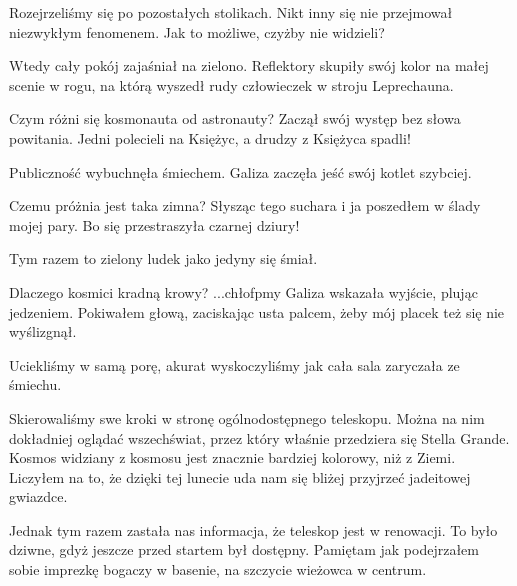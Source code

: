Rozejrzeliśmy się po pozostałych stolikach. Nikt inny się nie przejmował niezwykłym fenomenem.
Jak to możliwe, czyżby nie widzieli?

Wtedy cały pokój zajaśniał na zielono.
Reflektory skupiły swój kolor na małej scenie w rogu, na którą wyszedł rudy człowieczek w stroju Leprechauna.

\begin{dialogue}
	\ds{} Czym różni się kosmonauta od astronauty? \dm{} Zaczął swój występ bez słowa powitania. \dm{} Jedni polecieli na Księżyc, a drudzy z Księżyca spadli!
\end{dialogue}

Publiczność wybuchnęła śmiechem. Galiza zaczęła jeść swój kotlet szybciej.

\begin{dialogue}
	\ds{} Czemu próżnia jest taka zimna? \dm{} Słysząc tego suchara i ja poszedłem w ślady mojej pary. \dm{} Bo się przestraszyła czarnej dziury!
\end{dialogue}

Tym razem to zielony ludek jako jedyny się śmiał.

\begin{dialogue}
	\ds{} Dlaczego kosmici kradną krowy?
	\ds{} ...chłofpmy \dm{} Galiza wskazała wyjście, plując jedzeniem. Pokiwałem głową, zaciskając usta palcem, żeby mój placek też się nie wyślizgnął.
\end{dialogue}

Uciekliśmy w samą porę, akurat wyskoczyliśmy jak cała sala zaryczała ze śmiechu.

Skierowaliśmy swe kroki w stronę ogólnodostępnego teleskopu.
Można na nim dokładniej oglądać wszechświat, przez który właśnie przedziera się Stella Grande.
Kosmos widziany z kosmosu jest znacznie bardziej kolorowy, niż z Ziemi.
Liczyłem na to, że dzięki tej lunecie uda nam się bliżej przyjrzeć jadeitowej gwiazdce.

Jednak tym razem zastała nas informacja, że teleskop jest w renowacji.
To było dziwne, gdyż jeszcze przed startem był dostępny. Pamiętam jak podejrzałem sobie imprezkę bogaczy w basenie, na szczycie wieżowca w centrum.

